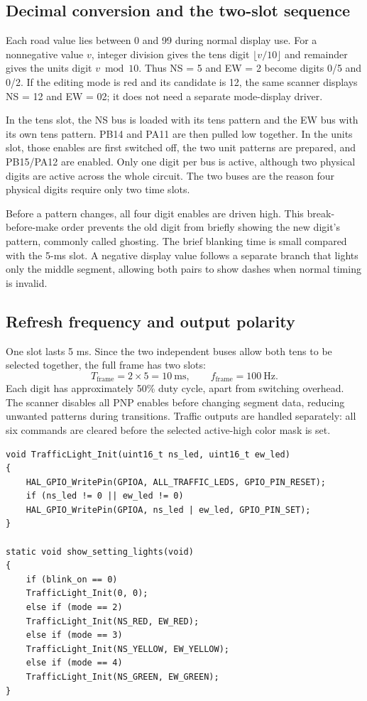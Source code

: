 \documentclass[a4paper]{article}
\newcommand{\topic}[1]{\subsection{#1}}
\begin{document}
\topic{Decimal conversion and the two-slot sequence}

Each road value lies between 0 and 99 during normal display use. For a
nonnegative value \(v\), integer division gives the tens digit
\(\lfloor v/10\rfloor\) and remainder gives the units digit \(v\bmod10\).
Thus NS = 5 and EW = 2 become digits 0/5 and 0/2. If the editing mode is
red and its candidate is 12, the same scanner displays NS = 12 and EW = 02;
it does not need a separate mode-display driver.

In the tens slot, the NS bus is loaded with its tens pattern and the EW bus
with its own tens pattern. PB14 and PA11 are then pulled low together.
In the units slot, those enables are first switched off, the two unit patterns
are prepared, and PB15/PA12 are enabled. Only one digit per bus is active,
although two physical digits are active across the whole circuit. The two
buses are the reason four physical digits require only two time slots.

Before a pattern changes, all four digit enables are driven high. This
break-before-make order prevents the old digit from briefly showing the new
digit's pattern, commonly called ghosting. The brief blanking time is small
compared with the 5-ms slot. A negative display value follows a separate
branch that lights only the middle segment, allowing both pairs to show
dashes when normal timing is invalid.


\topic{Refresh frequency and output polarity}
One slot lasts 5 ms. Since the two independent buses allow both tens to be
selected together, the full frame has two slots:
\[
T_{\mathrm{frame}}=2\times5=10\ \mathrm{ms},\qquad
f_{\mathrm{frame}}=100\ \mathrm{Hz}.
\]
Each digit has approximately 50\% duty cycle, apart from switching overhead.
The scanner disables all PNP enables before changing segment data, reducing
unwanted patterns during transitions. Traffic outputs are handled separately:
all six commands are cleared before the selected active-high color mask is set.

\par\noindent\begin{minipage}{\linewidth}
\begin{lstlisting}[caption={Traffic outputs and setting-color selection}]
void TrafficLight_Init(uint16_t ns_led, uint16_t ew_led)
{
    HAL_GPIO_WritePin(GPIOA, ALL_TRAFFIC_LEDS, GPIO_PIN_RESET);
    if (ns_led != 0 || ew_led != 0)
    HAL_GPIO_WritePin(GPIOA, ns_led | ew_led, GPIO_PIN_SET);
}

static void show_setting_lights(void)
{
    if (blink_on == 0)
    TrafficLight_Init(0, 0);
    else if (mode == 2)
    TrafficLight_Init(NS_RED, EW_RED);
    else if (mode == 3)
    TrafficLight_Init(NS_YELLOW, EW_YELLOW);
    else if (mode == 4)
    TrafficLight_Init(NS_GREEN, EW_GREEN);
}
\end{lstlisting}
\end{minipage}\par
\end{document}
